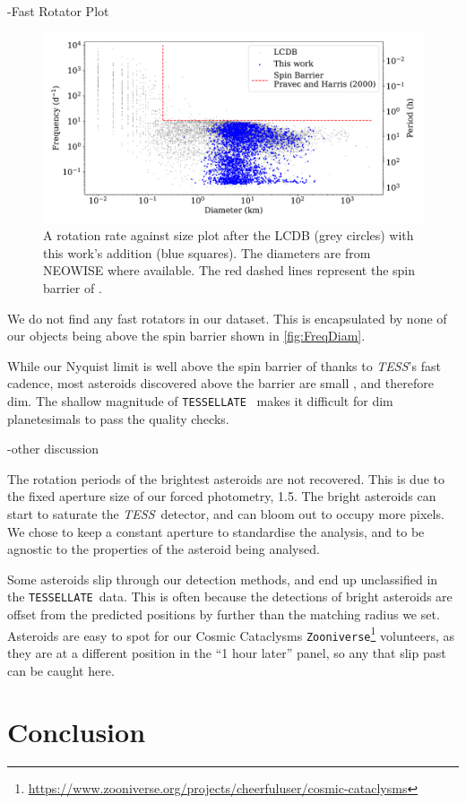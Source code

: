 \documentclass[12pt]{article}
\newcommand{\ttt}{\texttt}
\newcommand{\tess}{\textit{TESS}}
\newcommand{\tessellate}{\texttt{TESSELLATE}}
\begin{document}
-Fast Rotator Plot

\begin{figure}
    \centering
    \includegraphics[width=\textwidth]{Diam-FreqPlotThisWorkPaperFigDraft.pdf}
    \caption{A rotation rate against size plot after the LCDB \citep{Warner2009} (grey
        circles) with this work's addition (blue squares). The
        diameters are from NEOWISE \citep{Masiero2011,NEOWISE2019} where available. The red dashed lines represent the spin barrier of \citep{Pravec2000}.}
    \label{fig:FreqDiam}
\end{figure}


We do not find any fast rotators in our dataset.
This is encapsulated by none of our objects being above the spin barrier shown in \autoref{fig:FreqDiam}.


While our Nyquist limit is well above the spin barrier of \citet{Pravec2000} thanks to \tess's fast cadence, most asteroids discovered above the barrier are small%
, and therefore dim.
The shallow magnitude of \tessellate\ \citep{TESSELLATE} makes it difficult for dim planetesimals to pass the quality checks.


-other discussion

The rotation periods of the brightest asteroids are not recovered.
This is due to the fixed aperture size of our forced photometry, \qty{1.5}{\px}.
The bright asteroids can start to saturate the \tess\ detector, and can bloom out to occupy more pixels.
We chose to keep a constant aperture to standardise the analysis, and to be agnostic to the properties of the asteroid being analysed.

Some asteroids slip through our detection methods, and end up unclassified in the \tessellate\ data.
This is often because the detections of bright asteroids are offset from the predicted positions by further than the matching radius we set.
Asteroids are easy to spot for our Cosmic Cataclysms \ttt{Zooniverse}\footnote{\url{https://www.zooniverse.org/projects/cheerfuluser/cosmic-cataclysms}} volunteers, as they are at a different position in the ``1 hour later'' panel, so any that slip past can be caught here.


\section{Conclusion}\label{sec:Conc}



\end{document}

